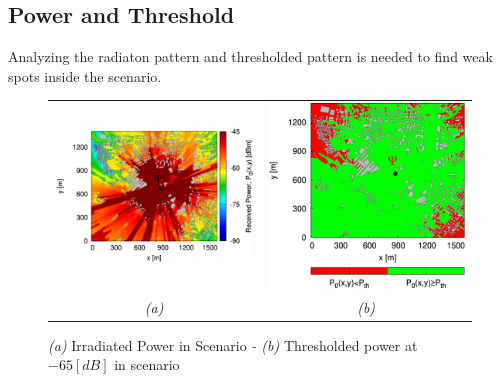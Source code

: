 \subsection{Power and Threshold}

Analyzing the radiaton pattern and thresholded pattern is needed to
find weak spots inside the scenario.

%
\begin{figure}[H]
\begin{center}\begin{tabular}{cc}
\includegraphics[scale=0.12]{./Figure/Planning.EM/Fig.Received.Power.Reference.jpg}&\includegraphics[scale=0.12]{./Figure/Planning.EM/Fig.Received.Power.Threshold.-65dBm.jpg}\tabularnewline
\emph{(a)}&
\emph{(b)}\tabularnewline
\end{tabular}\end{center}
\caption{\footnotesize \emph{(a)} Irradiated Power in Scenario \emph{- (b)} Thresholded
power at $-65[dB]$ in scenario }
\end{figure}
